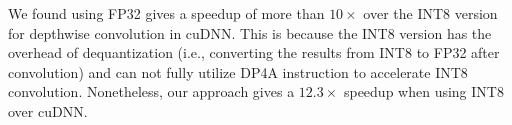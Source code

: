  We found using FP32 gives a speedup of more than $10\times$ over the INT8 version for depthwise convolution
in cuDNN. This is because the INT8 version has the overhead of dequantization (i.e., converting the results from INT8 to FP32 after
convolution) and can not fully utilize DP4A instruction to accelerate INT8 convolution. Nonetheless, our approach gives a $12.3\times$
speedup when using INT8 over cuDNN.





